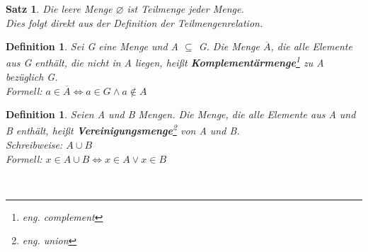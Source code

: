 \documentclass[12pt,german,a4]{article}
\begin{document}
\newtheorem{satz2}[satz]{Satz}
\begin{satz2}
Die leere Menge $\varnothing$ ist Teilmenge jeder Menge.\\
Dies folgt direkt aus der Definition der Teilmengenrelation.
\end{satz2}

\newtheorem{defComplement}[defSet]{Definition}
\begin{defComplement}
Sei G eine Menge und A $\subseteq$ G. Die Menge $\overline{A}$, die alle Elemente aus G enthält, die nicht in A liegen, heißt {\bf Komplementärmenge}\footnote{eng. complement} zu A bezüglich G.\\
Formell: $a \in \overline{A} \Leftrightarrow a \in G \wedge a \not\in A$\\
\end{defComplement}


\newtheorem{defUnion}[defSet]{Definition}
\begin{defUnion}
Seien A und B Mengen. Die Menge, die alle Elemente aus A und B enthält, heißt {\bf Vereinigungsmenge}\footnote{eng. union} von A und B.\\
Schreibweise: $A \cup B$\\
Formell: $x \in A \cup B \Leftrightarrow x \in A \vee x \in B$\\
\end{defUnion}

\\
\end{document}
